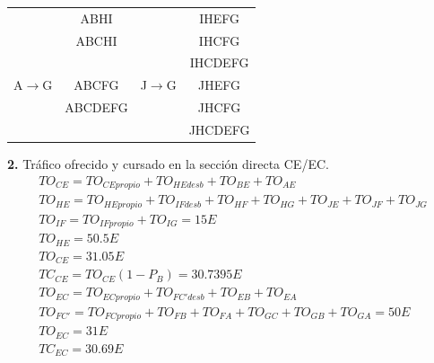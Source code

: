 \begin{exercise}[10]
\begin{center}
\begin{tabular}{c c c c}
 		& ABHI		&			& IHEFG		\\
 		& ABCHI		&			& IHCFG		\\
 		& 			&			& IHCDEFG	\\
A$\to$G & ABCFG  	& J$\to$G 	& JHEFG 	\\
 		& ABCDEFG	&			& JHCFG		\\
 		& 			&			& JHCDEFG	\\
\end{tabular}
\end{center}
\textbf{2.} Tráfico ofrecido y cursado en la sección directa CE/EC.\\
\begin{gather*}
TO_{CE}=TO_{CEpropio}+TO_{HEdesb}+TO_{BE}+TO_{AE}\\
TO_{HE}=TO_{HEpropio}+TO_{IFdesb}+TO_{HF}+TO_{HG}+TO_{JE}+TO_{JF}+TO_{JG}\\
TO_{IF}=TO_{IFpropio}+TO_{IG}=15E\\
TO_{HE}=50.5E\\
TO_{CE}=31.05E\\
TC_{CE}=TO_{CE}(1-P_B)=30.7395E\\
TO_{EC}=TO_{ECpropio}+TO_{FC'desb}+TO_{EB}+TO_{EA}\\
TO_{FC'}=TO_{FCpropio}+TO_{FB}+TO_{FA}+TO_{GC}+TO_{GB}+TO_{GA}=50E\\
TO_{EC}=31E\\
TC_{EC}=30.69E
\end{gather*}
\end{exercise}
